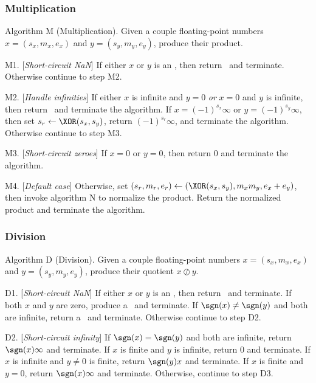 \subsubsection{Multiplication} 


\algbegin Algorithm M (Multiplication). \label{alg:float-multiplication}Given a couple floating-point
numbers $x=(s_{x},m_{x},e_{x})$ and $y=(s_{y}, m_{y}, e_{y})$, produce
their product.

\algstep M1. [{\it Short-circuit NaN\/}] If either $x$ or $y$ is an
\NaN, then return \qNaN\ and terminate. Otherwise continue to step M2.

\algstep M2. [{\it Handle infinities\/}] If either $x$ is infinite and
$y=0$ \emph{or} $x=0$ and $y$ is infinite, then return \qNaN\ and
terminate the algorithm.
If $x=(-1)^{s_{x}}\infty$ or $y=(-1)^{s_{y}}\infty$, then set
$s_{r}\gets\XOR(s_{x},s_{y})$, return $(-1)^{s_{r}}\infty$, and
terminate the algorithm.
Otherwise continue to step M3.

\algstep M3. [{\it Short-circuit zeroes\/}] If $x=0$ or $y=0$, then
return 0 and terminate the algorithm.

\algstep M4. [{\it Default case\/}] Otherwise, set
$(s_{r}, m_{r},e_{r})\gets (\XOR(s_{x},s_{y}), m_{x}m_{y}, e_{x}+e_{y})$,
then invoke algorithm N to normalize the product. Return the normalized
product and terminate the algorithm.\quad\slug

\subsubsection{Division}

\algbegin Algorithm D (Division). \label{alg:float-division}Given a couple floating-point
numbers $x=(s_{x},m_{x},e_{x})$ and $y=(s_{y}, m_{y}, e_{y})$, produce
their quotient $x\oslash y$.

\algstep D1. [{\it Short-circuit NaN\/}] If either $x$ or $y$ is an
\NaN, then return \qNaN\ and terminate. If both $x$ and $y$ are zero,
produce a \qNaN\ and terminate. If $\sgn(x)\neq\sgn(y)$ and both are
infinite, return a \qNaN\ and terminate. Otherwise continue to step D2.

\algstep D2. [{\it Short-circuit infinity\/}]
If $\sgn(x)=\sgn(y)$ and both are infinite, return $\sgn(x)\infty$ and terminate.
If $x$ is finite and $y$ is infinite, return 0 and terminate.
If $x$ is infinite and $y\neq0$ is finite, return $\sgn(y)x$ and terminate.
If $x$ is finite and $y=0$, return $\sgn(x)\infty$ and terminate.
Otherwise, continue to step D3.


